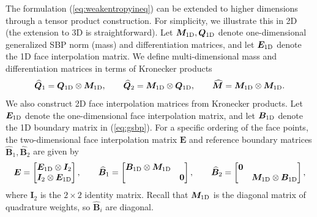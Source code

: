 \documentclass{svjour3}                     %
\renewcommand{\hat}{\widehat}
\begin{document}
The formulation (\ref{eq:weakentropyineq}) can be extended to higher dimensions through a tensor product construction.  For simplicity, we illustrate this in 2D (the extension to 3D is straightforward).  Let $\bm{M}_{\rm 1D}, \bm{Q}_{\rm 1D}$ denote one-dimensional generalized SBP norm (mass) and differentiation matrices, and let $\bm{E}_{\rm 1D}$ denote the 1D face interpolation matrix.  We define multi-dimensional  mass and differentiation matrices in terms of Kronecker products  
\begin{equation}
\hat{\bm{Q}}_1 = \bm{Q}_{\rm 1D} \otimes \bm{M}_{\rm 1D}, \qquad \hat{\bm{Q}}_2  = \bm{M}_{\rm 1D} \otimes \bm{Q}_{\rm 1D}, \qquad \hat{\bm{M}} = \bm{M}_{\rm 1D} \otimes  \bm{M}_{\rm 1D}.
\label{eq:kron}
\end{equation}
We also construct 2D face interpolation matrices from Kronecker products.  Let $\bm{E}_{\rm 1D}$ denote the one-dimensional face interpolation matrix, and let $\bm{B}_{\rm 1D}$ denote the 1D boundary matrix in (\ref{eq:gsbp}).  For a specific ordering of the face points, the two-dimensional face interpolation matrix $\bm{E}$ and reference boundary matrices $\hat{\bm{B}}_1, \hat{\bm{B}}_2$ are given by
\begin{equation}
\bm{E} = \begin{bmatrix}
\bm{E}_{\rm 1D} \otimes \bm{I}_{2}\\
\bm{I}_{2} \otimes \bm{E}_{\rm 1D} 
\end{bmatrix}, \qquad 
\hat{\bm{B}}_1 = \begin{bmatrix}
\bm{B}_{\rm 1D} \otimes \bm{M}_{\rm 1D} & \\
& \bm{0}
\end{bmatrix}, \qquad 
\hat{\bm{B}}_2 = \begin{bmatrix}
\bm{0} &\\
& \bm{M}_{\rm 1D} \otimes \bm{B}_{\rm 1D} 
\end{bmatrix},
\label{eq:EBdefs}
\end{equation}
where $\bm{I}_2$ is the $2\times 2$ identity matrix.  Recall that $\bm{M}_{\rm 1D}$ is the diagonal matrix of quadrature weights, so $\hat{\bm{B}}_i$ are diagonal.  
\end{document}
